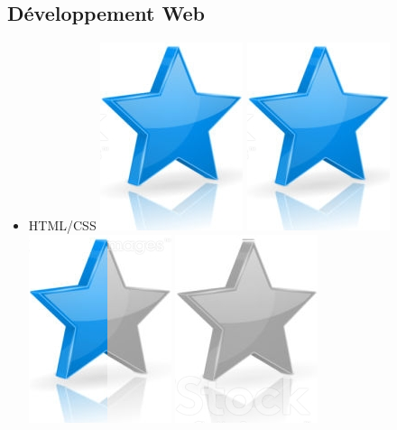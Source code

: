 \documentclass[10pt,a4paper,sans]{article}
\begin{document}
\begin{minipage}[t]{0.26\textwidth}
\begin{mdframed}[style=cadreCompetences]
        \subsection{Développement Web}
            \begin{itemize}
                \item{HTML/CSS
                    \hfill
                    \includegraphics[scale=0.20]{img/star.png} \hspace{-0.2cm}
                    \includegraphics[scale=0.20]{img/star.png} \hspace{-0.2cm}
                    \includegraphics[scale=0.20]{img/half_star.png} \hspace{-0.2cm}
                    \includegraphics[scale=0.20]{img/empty_star.png}
}
\end{itemize}
\end{mdframed}
\end{minipage}
\end{document}
